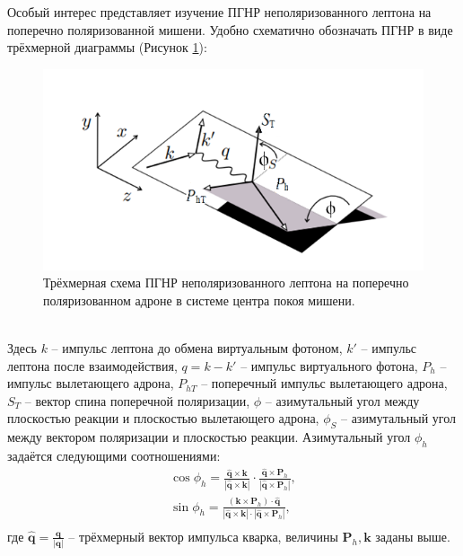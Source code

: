 \documentclass{extarticle}
\begin{document}
Особый интерес представляет изучение ПГНР неполяризованного лептона на поперечно поляризованной мишени. Удобно схематично обозначать ПГНР в виде трёхмерной диаграммы (Рисунок \ref{fig:sidis}):
\begin{figure}[h]
	\centering
	\includegraphics{sidis.png}
	\caption{Трёхмерная схема ПГНР неполяризованного лептона на поперечно поляризованном адроне в системе центра покоя мишени.}
	\label{fig:sidis}
\end{figure} \\
Здесь $k$ -- импульс лептона до обмена виртуальным фотоном, $k'$ -- импульс лептона после взаимодействия, $q = k-k'$ -- импульс виртуального фотона, $P_h$ -- импульс вылетающего адрона, $P_{hT}$ -- поперечный импульс вылетающего адрона, $S_T$ -- вектор спина поперечной поляризации, $\phi$ -- азимутальный угол между плоскостью реакции и плоскостью вылетающего адрона, $\phi_S$ -- азимутальный угол между вектором поляризации и плоскостью реакции. Азимутальный угол $\phi_h$ задаётся следующими соотношениями:
\begin{equation}
	\begin{split}
		\cos \phi_{h} = \frac{\hat{\textbf{q}} \times \textbf{k}}{|\hat{\textbf{q}} \times \textbf{k}|} \cdot \frac{\hat{\textbf{q}}\times \textbf{P}_h}{|\hat{\textbf{q}}\times \textbf{P}_h|}, \\
		\sin \phi_{h} = \frac{(\textbf{k}\times \textbf{P}_h)\cdot \hat{\textbf{q}}}{|\hat{\textbf{q}} \times \textbf{k}|\cdot|\hat{\textbf{q}}\times \textbf{P}_h|}, \\
	\end{split}
\end{equation}
где $\hat{\textbf{q}} = \frac{\textbf{q}}{|\textbf{q}|}$ -- трёхмерный вектор импульса кварка, величины $\textbf{P}_h, \textbf{k}$ заданы выше. 
\end{document}
